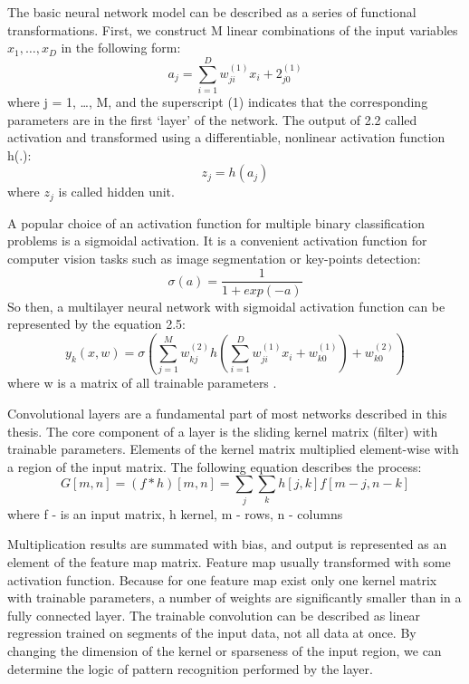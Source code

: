 The basic neural network model can be described as a series of functional transformations. First, we construct M linear combinations of the input variables $x_1, …, x_D$ in the following form:
\begin{equation}
a_j = \sum_{i=1}^{D}w_{ji}^{(1)}x_i+2_{j0}^{(1)}
\end{equation}
where j = 1, …, M, and the superscript (1) indicates that the corresponding parameters are in the first ‘layer’ of the network.
The output of 2.2 called activation and transformed using a differentiable, nonlinear activation function h(.):
\begin{equation}
z_j = h(a_j)
\end{equation}
where $z_j$ is called hidden unit.

A popular choice of an activation function for multiple binary classification problems is a sigmoidal activation. It is a convenient activation function for computer vision tasks such as image segmentation or key-points detection:
\begin{equation}
\sigma(a) = \frac{1}{1 + exp(-a)}
\end{equation}
So then, a multilayer neural network with sigmoidal activation function can be represented by the equation 2.5:
\begin{equation}
y_k(x,w) = \sigma\left(\sum_{j=1}^{M}w_{kj}^{(2)}h\left(\sum_{i=1}^{D}w_{ji}^{(1)}x_i + w_{k0}^{(1)}\right)+w_{k0}^{(2)}\right)
\end{equation}
where w is a matrix of all trainable parameters \cite{BISHOP}. 

Convolutional layers are a fundamental part of most networks described in this thesis. The core component of a layer is the sliding kernel matrix (filter) with trainable parameters. Elements of the kernel matrix multiplied element-wise with a region of the input matrix. The following equation describes the process:
\begin{equation}
G[m,n] = (f*h)[m,n] = \sum_{j}\sum_{k}h[j,k]f[m-j,n-k]
\end{equation}
where f - is an input matrix, h kernel, m - rows, n - columns 

Multiplication results are summated with bias, and output is represented as an element of the feature map matrix. Feature map usually transformed with some activation function. Because for one feature map exist only one kernel matrix with trainable parameters, a number of weights are significantly smaller than in a fully connected layer. The trainable convolution can be described as linear regression trained on segments of the input data, not all data at once. By changing the dimension of the kernel or sparseness of the input region, we can determine the logic of pattern recognition performed by the layer.

